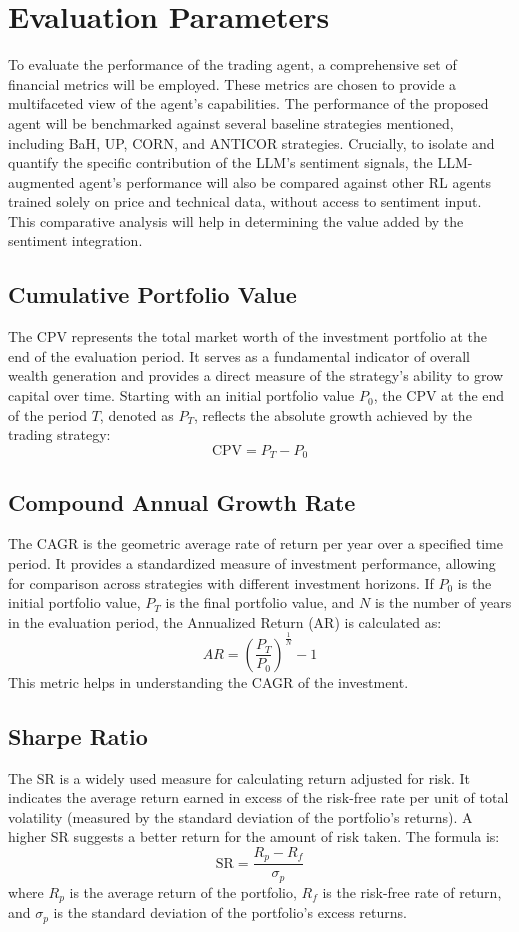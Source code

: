 \section{Evaluation Parameters}
To evaluate the performance of the trading agent, a comprehensive set of financial metrics will be employed. These metrics are chosen to provide a multifaceted view of the agent's capabilities. The performance of the proposed agent will be benchmarked against several baseline strategies mentioned, including \gls{BaH}, \gls{UP}, \gls{CORN}, and \gls{ANTICOR} strategies. Crucially, to isolate and quantify the specific contribution of the \gls{LLM}'s sentiment signals, the LLM-augmented agent's performance will also be compared against other \gls{RL} agents trained solely on price and technical data, without access to sentiment input. This comparative analysis will help in determining the value added by the sentiment integration.

\subsection{Cumulative Portfolio Value}
The \gls{CPV} represents the total market worth of the investment portfolio at the end of the evaluation period. It serves as a fundamental indicator of overall wealth generation and provides a direct measure of the strategy's ability to grow capital over time. Starting with an initial portfolio value \(P_0\), the CPV at the end of the period \(T\), denoted as \(P_T\), reflects the absolute growth achieved by the trading strategy:
\[\text{CPV} = P_T - P_0\]

\subsection{Compound Annual Growth Rate}
The \gls{CAGR} is the geometric average rate of return per year over a specified time period. It provides a standardized measure of investment performance, allowing for comparison across strategies with different investment horizons. If \(P_0\) is the initial portfolio value, \(P_T\) is the final portfolio value, and \(N\) is the number of years in the evaluation period, the Annualized Return (AR) is calculated as:
\[ AR = \left( \frac{P_T}{P_0} \right)^{\frac{1}{N}} - 1 \]
This metric helps in understanding the \gls{CAGR} of the investment.

\subsection{Sharpe Ratio}
The \gls{SR} is a widely used measure for calculating return adjusted for risk. It indicates the average return earned in excess of the risk-free rate per unit of total volatility (measured by the standard deviation of the portfolio's returns). A higher \gls{SR} suggests a better return for the amount of risk taken. The formula is:
\[\text{SR} = \frac{R_p - R_f}{\sigma_p}\]
where \(R_p\) is the average return of the portfolio, \(R_f\) is the risk-free rate of return, and \(\sigma_p\) is the standard deviation of the portfolio's excess returns.

